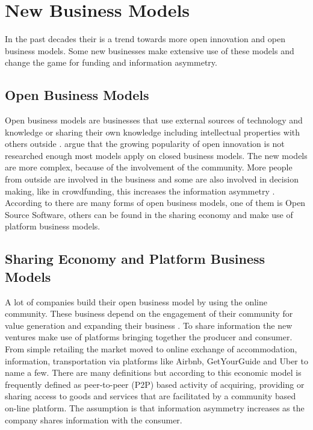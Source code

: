 \documentclass[a4paper, 11pt]{article}
\begin{document}
\section{New Business Models}
In the past decades their is a trend towards more open innovation and open business models. Some new businesses make extensive use of these models and change the game for funding and information asymmetry.

\subsection{Open Business Models}

Open business models are businesses that use external sources of technology and knowledge or sharing their own knowledge including intellectual properties with others outside \citep{chesbrough2007companies}.
\cite{colombo2016open} argue that the growing popularity of open innovation is not researched enough most models apply on closed business models. The new models are more complex, because of the involvement of the community. More people from outside are involved in the business and some are also involved in decision making, like in crowdfunding, this increases the information asymmetry \citep{colombo2016open}. According to \cite{colombo2016open} there are many forms of open business models, one of them is Open Source Software, others can be found in the sharing economy and make use of platform business models.


\subsection{Sharing Economy and Platform Business Models}
A lot of companies build their open business model by using the online community. These business depend on the engagement of their community for value generation and expanding their business \citep{colombo2016open}. To share information the new ventures make use of platforms bringing together the producer and consumer. From simple retailing the market moved to online exchange of accommodation, information, transportation via platforms like Airbnb, GetYourGuide and Uber to name a few. There are many definitions but according to \cite{investopia} this economic model is frequently defined as peer-to-peer (P2P) based activity of acquiring, providing or sharing access to goods and services that are facilitated by a community based on-line platform. The assumption is that information asymmetry increases as the company shares information with the consumer.
\end{document}

